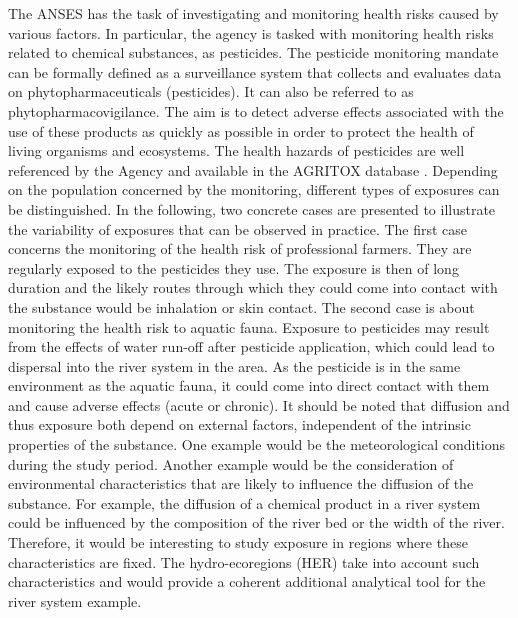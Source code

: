 The ANSES has the task of investigating and monitoring health risks caused by various factors. In particular, the agency is tasked with monitoring health risks related to chemical substances, as pesticides. The pesticide monitoring mandate can be formally defined as a surveillance system that collects and evaluates data on phytopharmaceuticals (pesticides). It can also be referred to as phytopharmacovigilance. The aim is to detect adverse effects associated with the use of these products as quickly as possible in order to protect the health of living organisms and ecosystems. The health hazards of pesticides are well referenced by the Agency and available in the AGRITOX database \citep{AGRITOX}. Depending on the population concerned by the monitoring, different types of exposures can be distinguished. In the following, two concrete cases are presented to illustrate the variability of exposures that can be observed in practice. The first case concerns the monitoring of the health risk of professional farmers. They are regularly exposed to the pesticides they use. The exposure is then of long duration and the likely routes through which they could come into contact with the substance would be inhalation or skin contact. The second case is about monitoring the health risk to aquatic fauna. Exposure to pesticides may result from the effects of water run-off after pesticide application, which could lead to dispersal into the river system in the area. As the pesticide is in the same environment as the aquatic fauna, it could come into direct contact with them and cause adverse effects (acute or chronic). It should be noted that diffusion and thus exposure both depend on external factors, independent of the intrinsic properties of the substance. One example would be the meteorological conditions during the study period. Another example would be the consideration of environmental characteristics that are likely to influence the diffusion of the substance. For example, the diffusion of a chemical product in a river system could be influenced by the composition of the river bed or the width of the river. Therefore, it would be interesting to study exposure in regions where these characteristics are fixed. The hydro-ecoregions (HER) take into account such characteristics and would provide a coherent additional analytical tool for the river system example.           


